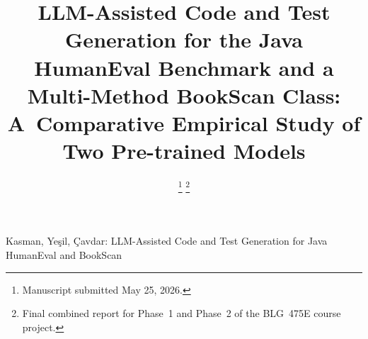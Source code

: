 \documentclass[journal]{IEEEtran}
\begin{document}
\title{LLM-Assisted Code and Test Generation for the Java HumanEval Benchmark and a Multi-Method BookScan Class: A~Comparative Empirical Study of Two Pre-trained Models}

\author{%
%
%
\thanks{Manuscript submitted May 25, 2026.}%
\thanks{Final combined report for Phase~1 and Phase~2 of the BLG~475E course project.}%
}

%
{Kasman, Ye\c{s}il, \c{C}avdar: LLM-Assisted Code and Test Generation for Java HumanEval and BookScan}

\maketitle
\end{document}
